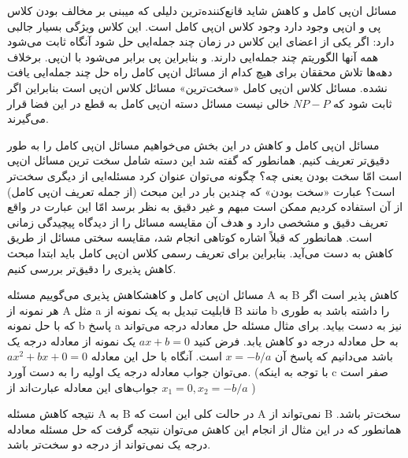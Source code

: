 \begin{itemframe}{مسائل ان‌پی کامل و کاهش}
\itm
شاید قانع‌کننده‌ترین دلیلی که میبنی بر مخالف بودن کلاس پی و ان‌پی وجود دارد وجود کلاس ان‌پی کامل است. این کلاس ویژگی بسیار جالبی دارد: اگر یکی از اعضای این کلاس در زمان چند جمله‌ایی حل شود آنگاه ثابت می‌شود همه آنها الگوریتم چند جمله‌ایی دارند. و بنابراین پی برابر می‌شود با ان‌پی.
\itm
برخلاف دهه‌ها تلاش محققان برای هیچ کدام از مسائل ان‌پی کامل راه حل چند جمله‌ایی یافت نشده.
\itm
مسائل کلاس ان‌پی کامل «سخت‌ترین» مسائل کلاس ان‌پی است بنابراین اگر ثابت شود که
$NP - P$
خالی نیست مسائل دسته ان‌پی کامل به قطع در این فضا قرار می‌گیرند.

\end{itemframe}

\begin{itemframe}{مسائل ان‌پی کامل و کاهش}
\itm
در این بخش می‌خواهیم مسائل ان‌پی کامل را به طور دقیق‌تر تعریف کنیم. همانطور که گفته شد این دسته شامل سخت ترین مسائل ان‌پی است امّا سخت بودن یعنی چه؟ چگونه می‌توان عنوان کرد مسئله‌ایی از دیگری سخت‌تر است؟
\itm
عبارت «سخت‌ بودن»
 که چندین بار در این مبحث (از جمله تعریف ان‌پی کامل) از آن استفاده کردیم ممکن است مبهم و غیر دقیق به نظر برسد امّا این عبارت در واقع تعریف دقیق و مشخصی دارد و هدف آن مقایسه مسائل را از دیدگاه پیچیدگی زمانی است.
\itm
همانطور که قبلاً اشاره کوتاهی انجام شد، مقایسه سختی مسائل  از طریق کاهش به دست می‌آید. بنابراین برای تعریف رسمی کلاس ان‌پی کامل باید ابتدا مبحث کاهش پذیری را دقیق‌تر بررسی کنیم.

\end{itemframe}

\begin{itemframe-s}{مسائل ان‌پی کامل و کاهش}{کاهش پذیری}
\itm
می‌گوییم مسئله A به B کاهش پذیر
 است اگر هر نمونه از A مثل a قابلیت تبدیل به یک نمونه از B مانند b را داشته باشد به طوری که با حل نمونه b پاسخ a نیز به دست بیاید.
\itm
برای مثال مسئله حل معادله درجه می‌تواند به حل معادله درجه دو کاهش یابد. فرض کنید $ax+b=0$ یک نمونه از معادله درجه یک باشد می‌دانیم که پاسخ آن
$ x = -b/a $
است.
آنگاه با حل این معادله $ ax^2+bx+0=0 $ می‌توان جواب معادله درجه یک اولیه را به دست آورد. (با توجه به اینکه c صفر است جواب‌های این معادله عبارت‌اند از
$ x_1 = 0, x_2= -b/a $
)

\itm
نتیجه کاهش مسئله A به B در حالت کلی این است که A نمی‌تواند از B سخت‌تر باشد. همانطور که در این مثال از انجام این کاهش می‌توان نتیجه گرفت که حل مسئله معادله درجه یک نمی‌تواند از درجه دو سخت‌تر باشد.
\end{itemframe-s}

